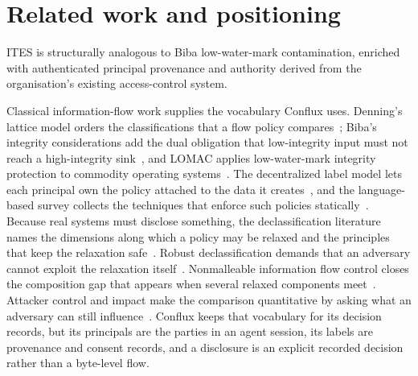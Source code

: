 \documentclass[11pt]{article}
\begin{document}
\section{Related work and positioning}
ITES is structurally analogous to Biba low-water-mark contamination, enriched
with authenticated principal provenance and authority derived from the
organisation's existing access-control system.

Classical information-flow work supplies the vocabulary Conflux uses. Denning's
lattice model orders the classifications that a flow policy
compares~\citep{denning1976}; Biba's integrity considerations add the dual
obligation that low-integrity input must not reach a high-integrity
sink~\citep{biba1977}, and LOMAC applies low-water-mark integrity protection to
commodity operating systems~\citep{lomac}. The decentralized label model lets
each principal own the policy attached to the data it
creates~\citep{myersliskov}, and the language-based survey collects the
techniques that enforce such policies statically~\citep{sabelfeld2003}. Because
real systems must disclose something, the declassification literature names the
dimensions along which a policy may be relaxed and the principles that keep the
relaxation safe~\citep{declassificationsurvey}. Robust declassification demands
that an adversary cannot exploit the relaxation
itself~\citep{robustdeclassification}. Nonmalleable information flow control
closes the composition gap that appears when several relaxed components
meet~\citep{nonmalleableifc}. Attacker control and impact make the comparison
quantitative by asking what an adversary can still
influence~\citep{attackercontrol}. Conflux keeps that vocabulary for its
decision records, but its principals are the parties in an agent session, its
labels are provenance and consent records, and a disclosure is an explicit
recorded decision rather than a byte-level flow.
\end{document}

